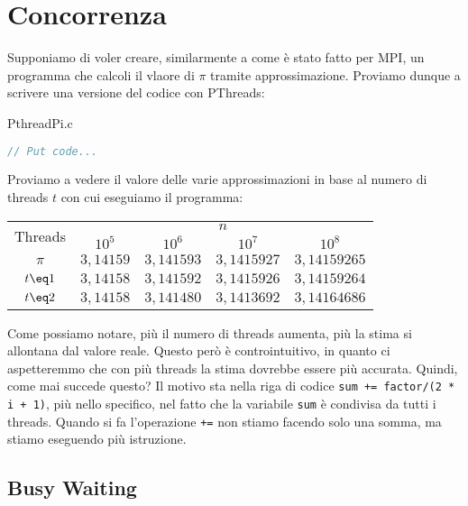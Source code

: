 \section{Concorrenza}

Supponiamo di voler creare, similarmente a come è stato fatto per MPI, un programma che calcoli il vlaore di $\pi$ tramite approssimazione. Proviamo dunque a scrivere una versione del codice con PThreads:

\begin{codeblock}{PthreadPi.c}
    \begin{lstlisting}[language = C]
// Put code...\end{lstlisting}
\end{codeblock}

Proviamo a vedere il valore delle varie approssimazioni in base al numero di threads $t$ con cui eseguiamo il programma:

\begin{center}
    \begin{tabular}{|c||c|c|c|c|}
        \hline
        \multirow{2}{*}{Threads} & \multicolumn{4}{c|}{$n$} \\
        \cline{2-5}\rule{0pt}{2.5ex} 
        & $10^5$ & $10^6$ & $10^7$ & $10^8$ \\
        \hline\hline
        $\pi$ & $3,14159$ & $3,141593$ & $3,1415927$ & $3,14159265$ \\
        \hline
        $t \eq 1$ & $3,14158$ & $3,141592$ & $3,1415926$ & $3,14159264$ \\
        \hline
        $t \eq 2$ & $3,14158$ & $3,141480$ & $3,1413692$ & $3,14164686$ \\
        \hline
    \end{tabular}
\end{center}

Come possiamo notare, più il numero di threads aumenta, più la stima si allontana dal valore reale. Questo però è controintuitivo, in quanto ci aspetteremmo che con più threads la stima dovrebbe essere più accurata. Quindi, come mai succede questo?
\nl
Il motivo sta nella riga di codice \verb|sum += factor/(2 * i + 1)|, più nello specifico, nel fatto che la variabile \verb|sum| è condivisa da tutti i threads. Quando si fa l'operazione \verb|+=| non stiamo facendo solo una somma, ma stiamo eseguendo più istruzione.

\subsection{Busy Waiting}

